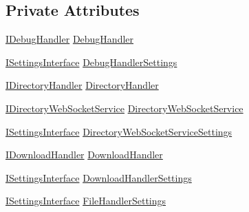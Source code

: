 \subsection*{Private Attributes}
\begin{DoxyCompactItemize}
\item 
\mbox{\hyperlink{interface_little_weeb_library_1_1_handlers_1_1_i_debug_handler}{I\+Debug\+Handler}} \mbox{\hyperlink{class_little_weeb_library_1_1_services_1_1_settings_web_socket_service_ab5a47129a4d077a3497d67c1b39e4b6d}{Debug\+Handler}}
\item 
\mbox{\hyperlink{interface_little_weeb_library_1_1_global_interfaces_1_1_i_settings_interface}{I\+Settings\+Interface}} \mbox{\hyperlink{class_little_weeb_library_1_1_services_1_1_settings_web_socket_service_a243293148010ce74979305982ffd9505}{Debug\+Handler\+Settings}}
\item 
\mbox{\hyperlink{interface_little_weeb_library_1_1_handlers_1_1_i_directory_handler}{I\+Directory\+Handler}} \mbox{\hyperlink{class_little_weeb_library_1_1_services_1_1_settings_web_socket_service_a5255bd82dcc248d48f25c5e2036007f2}{Directory\+Handler}}
\item 
\mbox{\hyperlink{interface_little_weeb_library_1_1_services_1_1_i_directory_web_socket_service}{I\+Directory\+Web\+Socket\+Service}} \mbox{\hyperlink{class_little_weeb_library_1_1_services_1_1_settings_web_socket_service_a9c882760b2b7bb5b4702d82fefa39c86}{Directory\+Web\+Socket\+Service}}
\item 
\mbox{\hyperlink{interface_little_weeb_library_1_1_global_interfaces_1_1_i_settings_interface}{I\+Settings\+Interface}} \mbox{\hyperlink{class_little_weeb_library_1_1_services_1_1_settings_web_socket_service_a834b0e787537121601b42a10c0f66b11}{Directory\+Web\+Socket\+Service\+Settings}}
\item 
\mbox{\hyperlink{interface_little_weeb_library_1_1_handlers_1_1_i_download_handler}{I\+Download\+Handler}} \mbox{\hyperlink{class_little_weeb_library_1_1_services_1_1_settings_web_socket_service_a5853b282a852f5d4bccf59bddf7a778c}{Download\+Handler}}
\item 
\mbox{\hyperlink{interface_little_weeb_library_1_1_global_interfaces_1_1_i_settings_interface}{I\+Settings\+Interface}} \mbox{\hyperlink{class_little_weeb_library_1_1_services_1_1_settings_web_socket_service_a9286d8fe383ca7d602cf880d70cc8057}{Download\+Handler\+Settings}}
\item 
\mbox{\hyperlink{interface_little_weeb_library_1_1_global_interfaces_1_1_i_settings_interface}{I\+Settings\+Interface}} \mbox{\hyperlink{class_little_weeb_library_1_1_services_1_1_settings_web_socket_service_ada9991c2723267302beca88b619d9f21}{File\+Handler\+Settings}}

\end{DoxyCompactItemize}

